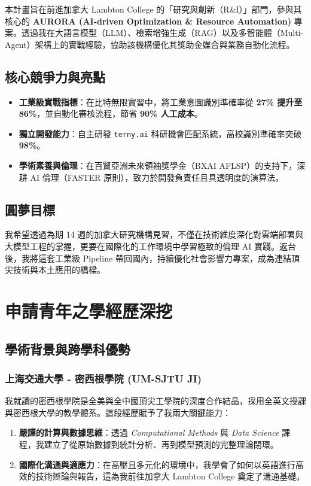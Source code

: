 \documentclass[12pt,a4paper]{article}
\begin{document}
本計畫旨在前進加拿大 Lambton College 的「研究與創新（R\&I）」部門，參與其核心的 \textbf{AURORA (AI-driven Optimization \& Resource Automation)} 專案。透過我在大語言模型（LLM）、檢索增強生成（RAG）以及多智能體（Multi-Agent）架構上的實戰經驗，協助該機構優化其獎助金媒合與業務自動化流程。

\subsection{核心競爭力與亮點}
\begin{itemize}
    \item \textbf{工業級實戰指標}：在比特無限實習中，將工業意圖識別準確率從 \textbf{27\% 提升至 86\%}，並自動化審核流程，節省 \textbf{90\% 人工成本}。
    \item \textbf{獨立開發能力}：自主研發 \texttt{terny.ai} 科研機會匹配系統，高校識別準確率突破 \textbf{98\%}。
    \item \textbf{學術素養與倫理}：在百賢亞洲未來領袖獎學金（BXAI AFLSP）的支持下，深耕 AI 倫理（FASTER 原則），致力於開發負責任且具透明度的演算法。
\end{itemize}

\subsection{圓夢目標}
我希望透過為期 14 週的加拿大研究機構見習，不僅在技術維度深化對雲端部署與大模型工程的掌握，更要在國際化的工作環境中學習極致的倫理 AI 實踐。返台後，我將這套工業級 Pipeline 帶回國內，持續優化社會影響力專案，成為連結頂尖技術與本土應用的橋樑。

\newpage

\section{申請青年之學經歷深挖}

\subsection{學術背景與跨學科優勢}

\subsubsection{上海交通大學 - 密西根學院 (UM-SJTU JI)}
我就讀的密西根學院是全美與全中國頂尖工學院的深度合作結晶，採用全英文授課與密西根大學的教學體系。這段經歷賦予了我兩大關鍵能力：
\begin{enumerate}
    \item \textbf{嚴謹的計算與數據思維}：透過 \textit{Computational Methods} 與 \textit{Data Science} 課程，我建立了從原始數據到統計分析、再到模型預測的完整理論閉環。
    \item \textbf{國際化溝通與適應力}：在高壓且多元化的環境中，我學會了如何以英語進行高效的技術辯論與報告，這為我前往加拿大 Lambton College 奠定了溝通基礎。
\end{enumerate}
\end{document}
